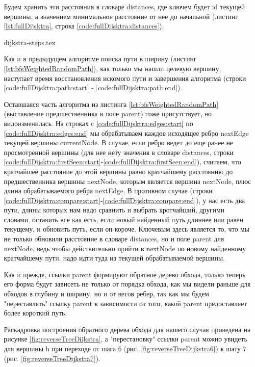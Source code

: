 \documentclass[../../article.tex]{subfiles}
\begin{document}
Будем хранить эти расстояния в словаре {\firacodebold distances}, где ключем будет {\firacodebold id} текущей вершины, а значением минимальное расстояние от нее до начальной (листинг \ref{lst:fullDijsktra}, строка \ref{code:fullDijsktra:distances}).

{dijkstra-steps.tex}

Как и в предыдущем алгоритме поиска пути в ширину (листинг \ref{lst:bfsWeightedRandomPath}), как только мы нашли целевую вершину, наступает время восстановления искомого пути и завершения алгоритма (строки \ref{code:fullDijsktra:path:start} - \ref{code:fullDijsktra:path:end}).

Оставшаяся часть алгоритма из листинга \ref{lst:bfsWeightedRandomPath} (выставление предшественника в поле {\firacodebold parent}) тоже присутствует, но видоизменилась. На строках с \ref{code:fullDijsktra:edges:start} по \ref{code:fullDijsktra:edges:end} мы обрабатываем каждое исходящее ребро {\firacodebold nextEdge} текущей вершины {\firacodebold currentNode}. В случае, если ребро ведет до еще ранее не просмотренной вершины (для нее нету значения в словаре {\firacodebold distances}, строки \ref{code:fullDijsktra:firstSeen:start}-\ref{code:fullDijsktra:firstSeen:end}), считаем, что кратчайшее расстояние до этой вершины равно кратчайшему расстоянию до предшественника вершины {\firacodebold nextNode}, которым является вершина {\firacodebold nextNode}, плюс длина обрабатываемого ребра {\firacodebold nextEdge}. В противном случае (строки \ref{code:fullDijsktra:compare:start}-\ref{code:fullDijsktra:compare:end}), у нас есть два пути, длины которых нам надо сравнить и выбрать кротчайший, другими словами, оставить все как есть, если новый найденный путь длиннее или равен текущему, и обновить путь, если он короче. Ключевым здесь является то, что мы не только обновили расстояние в словаре {\firacodebold distances}, но и поле {\firacodebold parent} для {\firacodebold nextNode}, ведь чтобы действительно прийти в nextNode по новому найденному кратчайшему пути, надо идти туда из текущей обрабатываемой вершины.

Как и прежде, ссылки {\firacodebold parent} формируют обратное дерево обхода, только теперь его форма будут зависеть не только от порядка обхода, как мы видели раньше для обходов в глубину и ширину, но и от весов ребер, так как мы будем "переставлять" ссылку {\firacodebold parent} в зависимости от того, какой {\firacodebold parent} предоставляет более короткий путь.

Раскадровка построения обратного дерева обхода для нашего случая приведена на рисунке \ref{fig:reverseTreeDijkstra}, а "перестановку" ссылки parent можно увидеть для вершины h при переходе от шага 6 (рис. \ref{fig:reverseTreeDijkstra6}) к шагу 7 (рис. \ref{fig:reverseTreeDijkstra7}).
\end{document}
